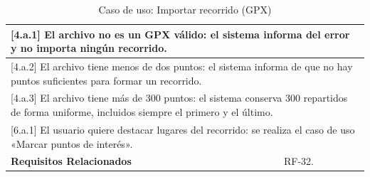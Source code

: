 \begin{table}[h!]
\begin{tabular}{|p{4cm}|p{11cm}|}
        \hline
        \multicolumn{2}{|p{15cm}|}{ [4.a.1] El archivo no es un GPX válido: el sistema informa del error y no importa ningún recorrido. } \\
        \hline
        \multicolumn{2}{|p{15cm}|}{ [4.a.2] El archivo tiene menos de dos puntos: el sistema informa de que no hay puntos suficientes para formar un recorrido. } \\
        \hline
        \multicolumn{2}{|p{15cm}|}{ [4.a.3] El archivo tiene más de 300 puntos: el sistema conserva 300 repartidos de forma uniforme, incluidos siempre el primero y el último. } \\
        \hline
        \multicolumn{2}{|p{15cm}|}{ [6.a.1] El usuario quiere destacar lugares del recorrido: se realiza el caso de uso «Marcar puntos de interés». } \\
        \hline
        \textbf{Requisitos Relacionados} & RF-32. \\
        \hline
    \end{tabular}
    \caption{Caso de uso: Importar recorrido (GPX)}
\end{table}

